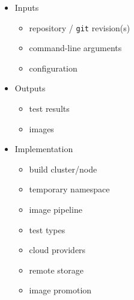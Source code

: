 \begin{frame}
    \autotitle
    \begin{multicols}{2}
        \begin{itemize}
            \item
                Inputs
                \begin{itemize}
                    \item repository / \texttt{git} revision(s)
                    \item command-line arguments
                    \item configuration
                \end{itemize}
        \end{itemize}
        \begin{itemize}
            \item
                Outputs
                \begin{itemize}
                    \item test results
                    \item images
                \end{itemize}
        \end{itemize}
        \columnbreak
        \begin{itemize}
            \item<2>
                Implementation
                \begin{itemize}
                    \item build cluster/node
                    \item temporary namespace
                    \item image pipeline
                    \item test types
                    \item cloud providers
                    \item remote storage
                    \item image promotion
                \end{itemize}
        \end{itemize}
    \end{multicols}
\end{frame}

